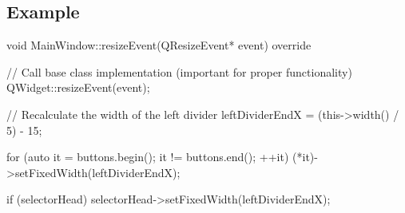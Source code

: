 \documentclass{report}
\begin{document}
    \subsection{Example}
    \bigbreak \noindent 
    \begin{cppcode}
void MainWindow::resizeEvent(QResizeEvent* event) override {
    // Call base class implementation (important for proper functionality)
    QWidget::resizeEvent(event);

    // Recalculate the width of the left divider
    leftDividerEndX = (this->width() / 5) - 15;

    for (auto it = buttons.begin(); it != buttons.end(); ++it) {
        (*it)->setFixedWidth(leftDividerEndX);
    }

    if (selectorHead) {
        selectorHead->setFixedWidth(leftDividerEndX);
    }
}

    \end{cppcode}
    
    
\end{document}
